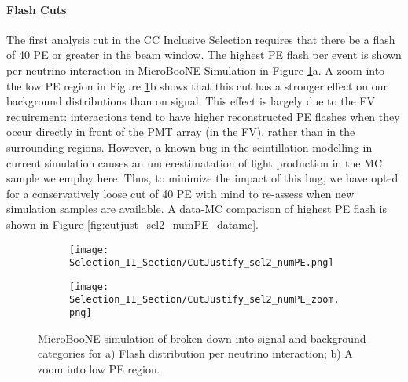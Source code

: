 \paragraph{Flash Cuts}

The first analysis cut in the CC Inclusive Selection requires that there be a flash of 40 PE or greater in the beam window. The highest PE flash per event is shown per neutrino interaction in MicroBooNE Simulation in Figure \ref{fig:cutjust_sel2_numPE}a. A zoom into the low PE region in Figure \ref{fig:cutjust_sel2_numPE}b shows that this cut has a stronger effect on our background distributions than on signal. This effect is largely due to the FV requirement: interactions tend to have higher reconstructed PE flashes when they occur directly in front of the PMT array (in the FV), rather than in the surrounding regions. However, a known bug in the scintillation modelling in current simulation causes an underestimatation of light production in the MC sample we employ here.  Thus, to minimize the impact of this bug, we have opted for a conservatively loose cut of 40 PE with mind to re-assess when new simulation samples are available.  A data-MC comparison of highest PE flash is shown in Figure \ref{fig:cutjust_sel2_numPE_datamc}.


\begin{figure}[H]
  \centering
  \begin{subfigure}[t]{0.4\textwidth}
    \centering
    \texttt{[image: Selection\_II\_Section/CutJustify\_sel2\_numPE.png]}
    \caption{ }
  \end{subfigure}
    \hspace{10 mm}
   \begin{subfigure}[t]{0.4\textwidth}
    \centering
    \texttt{[image: Selection\_II\_Section/CutJustify\_sel2\_numPE\_zoom.png]}
    \caption{ }
  \end{subfigure}
\caption{ MicroBooNE simulation of broken down into signal and background categories for a) Flash distribution per neutrino interaction; b) A zoom into low PE region. }
\label{fig:cutjust_sel2_numPE}
\end{figure}


